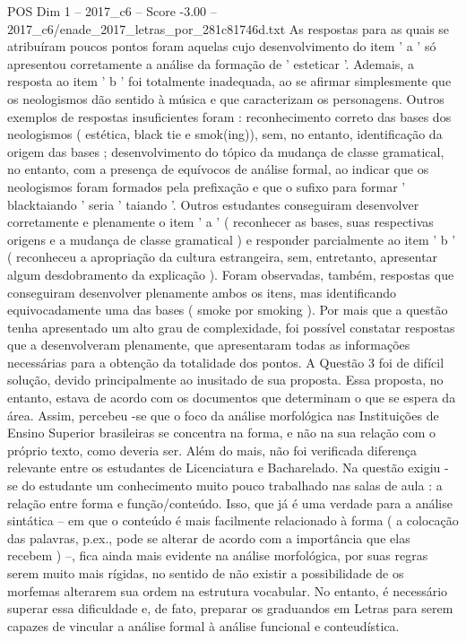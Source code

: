 \begin{textsample}{POS Dim 1 – 2017\_c6 – Score -3.00 – 2017\_c6/enade\_2017\_letras\_por\_281c81746d.txt}
As respostas para as quais se atribuíram poucos pontos foram aquelas cujo desenvolvimento do item ' a ' só apresentou corretamente a análise da formação de ' esteticar '.
Ademais, a resposta ao item ' b ' foi totalmente inadequada, ao se afirmar simplesmente que os neologismos dão sentido à música e que caracterizam os personagens.
Outros exemplos de respostas insuficientes foram : reconhecimento correto das bases dos neologismos ( estética, black tie e smok(ing)), sem, no entanto, identificação da origem das bases ; desenvolvimento do tópico da mudança de classe gramatical, no entanto, com a presença de equívocos de análise formal, ao indicar que os neologismos foram formados pela prefixação e que o sufixo para formar ' blacktaiando ' seria ' taiando '.
Outros estudantes conseguiram desenvolver corretamente e plenamente o item ' a ' ( reconhecer as bases, suas respectivas origens e a mudança de classe gramatical ) e responder parcialmente ao item ' b ' ( reconheceu a apropriação da cultura estrangeira, sem, entretanto, apresentar algum desdobramento da explicação ).
Foram observadas, também, respostas que conseguiram desenvolver plenamente ambos os itens, mas identificando equivocadamente uma das bases ( smoke por smoking ).
Por mais que a questão tenha apresentado um alto grau de complexidade, foi possível constatar respostas que a desenvolveram plenamente, que apresentaram todas as informações necessárias para a obtenção da totalidade dos pontos.
A Questão 3 foi de difícil solução, devido principalmente ao inusitado de sua proposta.
Essa proposta, no entanto, estava de acordo com os documentos que determinam o que se espera da área.
Assim, percebeu -se que o foco da análise morfológica nas Instituições de Ensino Superior brasileiras se concentra na forma, e não na sua relação com o próprio texto, como deveria ser.
Além do mais, não foi verificada diferença relevante entre os estudantes de Licenciatura e Bacharelado.
Na questão exigiu -se do estudante um conhecimento muito pouco trabalhado nas salas de aula : a relação entre forma e função/conteúdo.
Isso, que já é uma verdade para a análise sintática – em que o conteúdo é mais facilmente relacionado à forma ( a colocação das palavras, p.ex., pode se alterar de acordo com a importância que elas recebem ) –, fica ainda mais evidente na análise morfológica, por suas regras serem muito mais rígidas, no sentido de não existir a possibilidade de os morfemas alterarem sua ordem na estrutura vocabular.
No entanto, é necessário superar essa dificuldade e, de fato, preparar os graduandos em Letras para serem capazes de vincular a análise formal à análise funcional e conteudística.

\end{textsample}
